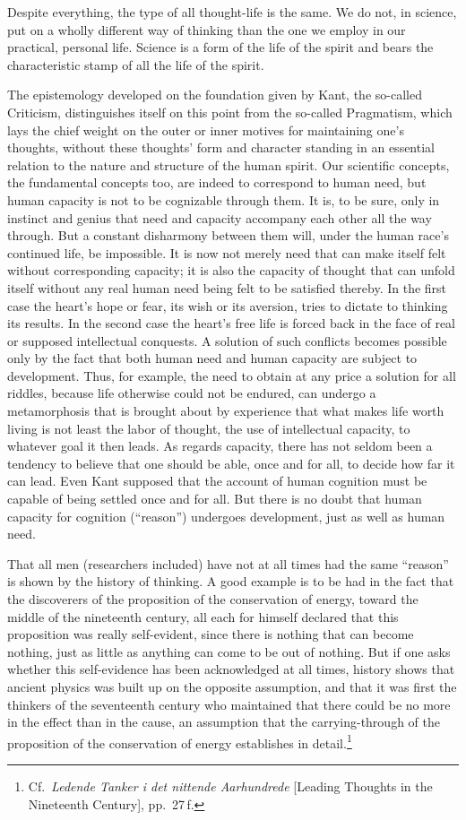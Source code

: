 \documentclass[12pt]{book}
\newcommand{\opage}[1]{\marginnote{\footnotesize\textit{[#1]}}}
\begin{document}
Despite everything, the type of all thought-life is the same. We do not, in science, put on a wholly
different way of thinking than the one we employ in our practical, personal life. Science is a form
of the life of the spirit and bears the characteristic stamp of all the life of the spirit.

The epistemology developed on the foundation given by Kant, the so-called Criticism, distinguishes
itself on this point from the so-called Pragmatism, which lays the chief weight on the outer or inner
motives for maintaining one's thoughts, without these thoughts' form and character standing in an
essential relation to the nature and structure of the human spirit. Our scientific concepts, the
fundamental concepts too, are indeed to correspond to human need, but human capacity is not to be
cognizable through them. It is, to be sure, only in instinct and genius that need and capacity
accompany each other all the way through. But a constant disharmony between them will, under the
human race's continued life, be impossible. It is now not merely need that can make itself felt
without corresponding capacity; it is also the capacity of thought that can unfold itself without any
real human need being felt to be satisfied thereby. In the first case the heart's hope or fear, its
wish or its aversion, tries to dictate to thinking its results. In the second case the heart's free
life is forced back in the face of real or supposed intellectual conquests. A solution of such
conflicts becomes possible only by the fact that both human need and human capacity are subject to
development. Thus, for example, \opage{13}the need to obtain at any price a solution for all riddles, because
life otherwise could not be endured, can undergo a metamorphosis that is brought about by experience
that what makes life worth living is not least the labor of thought, the use of intellectual
capacity, to whatever goal it then leads. As regards capacity, there has not seldom been a tendency
to believe that one should be able, once and for all, to decide how far it can lead. Even Kant
supposed that the account of human cognition must be capable of being settled once and for all. But
there is no doubt that human capacity for cognition (``reason'') undergoes development, just as well
as human need.

That all men (researchers included) have not at all times had the same ``reason'' is shown by the
history of thinking. A good example is to be had in the fact that the discoverers of the proposition
of the conservation of energy, toward the middle of the nineteenth century, all each for himself
declared that this proposition was really self-evident, since there is nothing that can become
nothing, just as little as anything can come to be out of nothing. But if one asks whether this
self-evidence has been acknowledged at all times, history shows that ancient physics was built up on
the opposite assumption, and that it was first the thinkers of the seventeenth century who maintained
that there could be no more in the effect than in the cause, an assumption that the carrying-through
of the proposition of the conservation of energy establishes in detail.\footnote{Cf.\ \textit{Ledende
Tanker i det nittende Aarhundrede} [Leading Thoughts in the Nineteenth Century], pp.\ 27\,f.}
\end{document}

